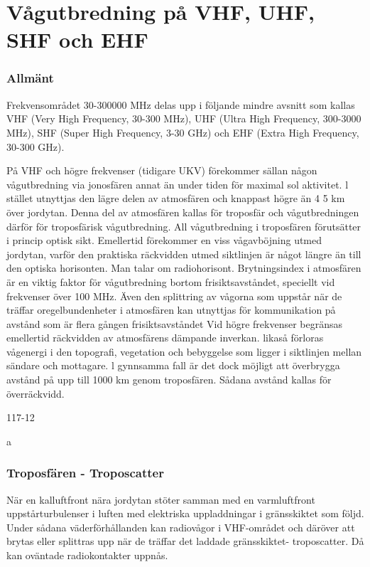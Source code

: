 \section{Vågutbredning på VHF, UHF, SHF och EHF}

\subsubsection{Allmänt}
Frekvensområdet 30-300000 MHz delas upp
i följande mindre avsnitt som kallas
VHF (Very High Frequency, 30-300 MHz),
UHF (Ultra High Frequency, 300-3000 MHz),
SHF (Super High Frequency, 3-30 GHz) och
EHF (Extra High Frequency, 30-300 GHz).

På VHF och högre frekvenser (tidigare UKV)
förekommer sällan någon vågutbredning via
jonosfären annat än under tiden för maximal
sol aktivitet. l stället utnyttjas den lägre delen
av atmosfären och knappast högre än 4 5
km över jordytan. Denna del av atmosfären
kallas för troposfär och vågutbredningen
därför för troposfärisk vågutbredning.
All vågutbredning i troposfären förutsätter i princip optisk sikt. Emellertid förekommer en viss vågavböjning utmed jordytan,
varför den praktiska räckvidden utmed siktlinjen är något längre än till den optiska
horisonten. Man talar om radiohorisont.
Brytningsindex i atmosfären är en viktig
faktor för vågutbredning bortom frisiktsavståndet, speciellt vid frekvenser över 100
MHz. Även den splittring av vågorna som
uppstår när de träffar oregelbundenheter i
atmosfären kan utnyttjas för kommunikation
på avstånd som är flera gången frisiktsavståndet
Vid högre frekvenser begränsas emellertid räckvidden av atmosfärens dämpande
inverkan. likaså förloras vågenergi i den
topografi, vegetation och bebyggelse som
ligger i siktlinjen mellan sändare och mottagare. l gynnsamma fall är det dock möjligt att
överbrygga avstånd på upp till 1000 km
genom troposfären. Sådana avstånd kallas
för överräckvidd.

117-12


a

\subsubsection{Troposfären - Troposcatter}
När en kalluftfront nära jordytan stöter samman med en varmluftfront uppstårturbulenser
i luften med elektriska uppladdningar i gränsskiktet som följd.
Under sådana väderförhållanden kan
radiovågor i VHF-området och däröver att
brytas eller splittras upp när de träffar det
laddade gränsskiktet- troposcatter. Då kan
oväntade radiokontakter uppnås.

